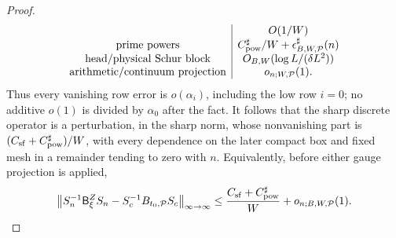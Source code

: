 \documentclass[11pt]{article}
\numberwithin{equation}{section}
\theoremstyle{definition}
\theoremstyle{remark}
\newcommand{\1}{\mathbf 1}
\begin{document}
\begin{proof}
\[\begin{array}{c|c}
   &O(1/W)\\
 \text{prime powers}
   &C_{\rm pow}^{\sharp}/W+
       \epsilon^\sharp_{B,W,\mathcal P}(n)\\
 \text{head/physical Schur block}
   &O_{B,W}(\log L/(\delta L^2))\\
 \text{arithmetic/continuum projection}
   &o_{n;W,\mathcal P}(1).
\end{array}
\]
Thus every vanishing row error is \(o(\alpha_i)\), including the low
row \(i=0\); no additive \(o(1)\) is divided by \(\alpha_0\) after the
fact.  It follows that the sharp discrete operator is a perturbation, in
the sharp norm,
whose nonvanishing part is
\((C_{\rm sf}+C_{\rm pow}^{\sharp})/W\), with every dependence on the
later compact box and fixed mesh in a remainder tending to zero with
\(n\).  Equivalently, before either gauge projection is applied,
\begin{equation}
 \left\|S_n^{-1}\mathsf B^Z_\xi S_n
       -S_c^{-1}B_{t_0,\mathcal P}S_c\right\|_{\infty\to\infty}
 \leq\frac{C_{\rm sf}+C_{\rm pow}^{\sharp}}W
       +o_{n;B,W,\mathcal P}(1).
 \label{eq:smooth-unprojected-sharp-operator-comparison}
\end{equation}


\end{proof}
\end{document}
